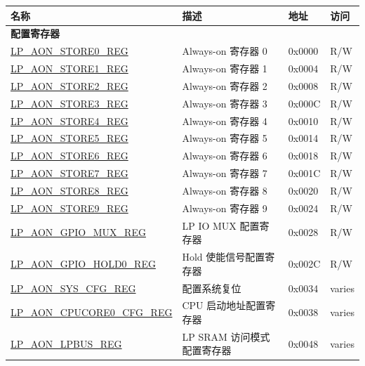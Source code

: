 \begin{longtable}{ | l | p{6.5cm} | p{1.3cm} | p{1cm} | }
\hline\rowcolor{lightgray}
\textbf{名称} & \textbf{描述} &  \textbf{地址} & \textbf{访问} \\ \hline
\endhead
\multicolumn{4}{|l|}{\textbf{配置寄存器}} \\ \hline
\hyperref[regdesc:LPAONSTORENREG]{LP\_AON\_STORE0\_REG} & Always-on 寄存器 0 & 0x0000 & R/W \\ \hline
\hyperref[regdesc:LPAONSTORENREG]{LP\_AON\_STORE1\_REG} & Always-on 寄存器 1 & 0x0004 & R/W \\ \hline
\hyperref[regdesc:LPAONSTORENREG]{LP\_AON\_STORE2\_REG} & Always-on 寄存器 2 & 0x0008 & R/W \\ \hline
\hyperref[regdesc:LPAONSTORENREG]{LP\_AON\_STORE3\_REG} & Always-on 寄存器 3 & 0x000C & R/W \\ \hline
\hyperref[regdesc:LPAONSTORENREG]{LP\_AON\_STORE4\_REG} & Always-on 寄存器 4 & 0x0010 & R/W \\ \hline
\hyperref[regdesc:LPAONSTORENREG]{LP\_AON\_STORE5\_REG} & Always-on 寄存器 5 & 0x0014 & R/W \\ \hline
\hyperref[regdesc:LPAONSTORENREG]{LP\_AON\_STORE6\_REG} & Always-on 寄存器 6 & 0x0018 & R/W \\ \hline
\hyperref[regdesc:LPAONSTORENREG]{LP\_AON\_STORE7\_REG} & Always-on 寄存器 7 & 0x001C & R/W \\ \hline
\hyperref[regdesc:LPAONSTORENREG]{LP\_AON\_STORE8\_REG} & Always-on 寄存器 8 & 0x0020 & R/W \\ \hline
\hyperref[regdesc:LPAONSTORENREG]{LP\_AON\_STORE9\_REG} & Always-on 寄存器 9 & 0x0024 & R/W \\ \hline
\hyperref[regdesc:LPAONGPIOMUXREG]{LP\_AON\_GPIO\_MUX\_REG} & LP IO MUX 配置寄存器 & 0x0028 & R/W \\ \hline
\hyperref[regdesc:LPAONGPIOHOLD0REG]{LP\_AON\_GPIO\_HOLD0\_REG} & Hold 使能信号配置寄存器 & 0x002C & R/W \\ \hline
\hyperref[regdesc:LPAONSYSCFGREG]{LP\_AON\_SYS\_CFG\_REG} & 配置系统复位 & 0x0034 & varies \\ \hline
\hyperref[regdesc:LPAONCPUCORE0CFGREG]{LP\_AON\_CPUCORE0\_CFG\_REG} & CPU 启动地址配置寄存器 & 0x0038 & varies \\ \hline
\hyperref[regdesc:LPAONLPBUSREG]{LP\_AON\_LPBUS\_REG} & LP SRAM 访问模式配置寄存器 & 0x0048 & varies \\ \hline
\end{longtable}
